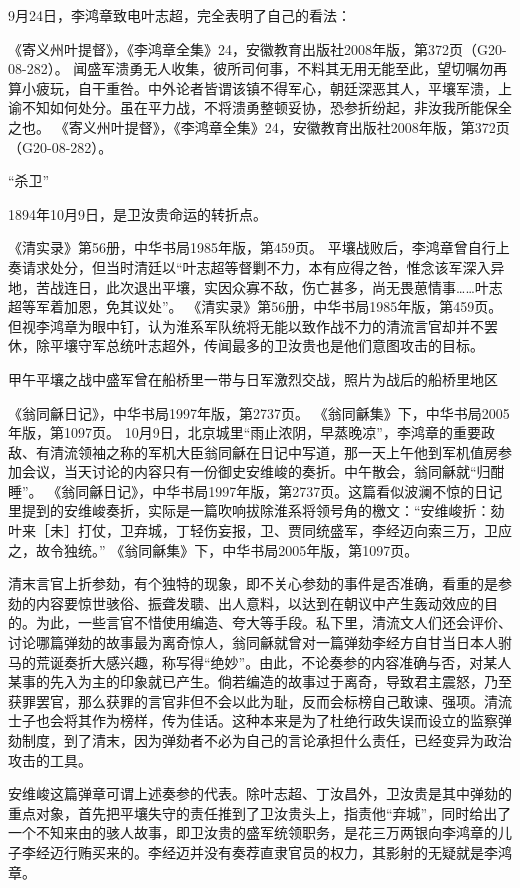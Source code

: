 \documentclass[12pt,UTF8]{ctexbook}
\begin{document}
9月24日，李鸿章致电叶志超，完全表明了自己的看法：

《寄义州叶提督》，《李鸿章全集》24，安徽教育出版社2008年版，第372页（G20-08-282）。
闻盛军溃勇无人收集，彼所司何事，不料其无用无能至此，望切嘱勿再算小疲玩，自干重咎。中外论者皆谓该镇不得军心，朝廷深恶其人，平壤军溃，上谕不知如何处分。虽在平力战，不将溃勇整顿妥协，恐参折纷起，非汝我所能保全之也。 《寄义州叶提督》，《李鸿章全集》24，安徽教育出版社2008年版，第372页（G20-08-282）。

“杀卫”

1894年10月9日，是卫汝贵命运的转折点。

《清实录》第56册，中华书局1985年版，第459页。
平壤战败后，李鸿章曾自行上奏请求处分，但当时清廷以“叶志超等督剿不力，本有应得之咎，惟念该军深入异地，苦战连日，此次退出平壤，实因众寡不敌，伤亡甚多，尚无畏葸情事……叶志超等军着加恩，免其议处”。 《清实录》第56册，中华书局1985年版，第459页。但视李鸿章为眼中钉，认为淮系军队统将无能以致作战不力的清流言官却并不罢休，除平壤守军总统叶志超外，传闻最多的卫汝贵也是他们意图攻击的目标。


甲午平壤之战中盛军曾在船桥里一带与日军激烈交战，照片为战后的船桥里地区

《翁同龢日记》，中华书局1997年版，第2737页。
《翁同龢集》下，中华书局2005年版，第1097页。
10月9日，北京城里“雨止浓阴，早蒸晚凉”，李鸿章的重要政敌、有清流领袖之称的军机大臣翁同龢在日记中写道，那一天上午他到军机值房参加会议，当天讨论的内容只有一份御史安维峻的奏折。中午散会，翁同龢就“归酣睡”。 《翁同龢日记》，中华书局1997年版，第2737页。这篇看似波澜不惊的日记里提到的安维峻奏折，实际是一篇吹响拔除淮系将领号角的檄文：“安维峻折：劾叶来［未］打仗，卫弃城，丁轻伤妄报，卫、贾同统盛军，李经迈向索三万，卫应之，故令独统。” 《翁同龢集》下，中华书局2005年版，第1097页。

清末言官上折参劾，有个独特的现象，即不关心参劾的事件是否准确，看重的是参劾的内容要惊世骇俗、振聋发聩、出人意料，以达到在朝议中产生轰动效应的目的。为此，一些言官不惜使用编造、夸大等手段。私下里，清流文人们还会评价、讨论哪篇弹劾的故事最为离奇惊人，翁同龢就曾对一篇弹劾李经方自甘当日本人驸马的荒诞奏折大感兴趣，称写得“绝妙”。由此，不论奏参的内容准确与否，对某人某事的先入为主的印象就已产生。倘若编造的故事过于离奇，导致君主震怒，乃至获罪罢官，那么获罪的言官非但不会以此为耻，反而会标榜自己敢谏、强项。清流士子也会将其作为榜样，传为佳话。这种本来是为了杜绝行政失误而设立的监察弹劾制度，到了清末，因为弹劾者不必为自己的言论承担什么责任，已经变异为政治攻击的工具。

安维峻这篇弹章可谓上述奏参的代表。除叶志超、丁汝昌外，卫汝贵是其中弹劾的重点对象，首先把平壤失守的责任推到了卫汝贵头上，指责他“弃城”，同时给出了一个不知来由的骇人故事，即卫汝贵的盛军统领职务，是花三万两银向李鸿章的儿子李经迈行贿买来的。李经迈并没有奏荐直隶官员的权力，其影射的无疑就是李鸿章。
\end{document}
